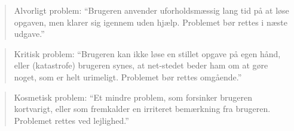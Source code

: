 \begin{quote}
Alvorligt problem: ``Brugeren anvender uforholdsmæssig lang tid på at løse opgaven, men klarer sig igennem uden hjælp. Problemet bør rettes i næste udgave.''\cite{usabilitykat}
\end{quote}

\begin{quote}
Kritisk problem: ``Brugeren kan ikke løse en stillet opgave på egen hånd, eller (katastrofe) brugeren synes, at net-stedet beder ham om at gøre noget, som er helt urimeligt. Problemet bør rettes omgående.''\cite{usabilitykat}
\end{quote}

\begin{quote}
Kosmetisk problem: ``Et mindre problem, som forsinker brugeren kortvarigt, eller som fremkalder en irriteret bemærkning fra brugeren. Problemet rettes ved lejlighed.''\cite{usabilitykat}
\end{quote}


